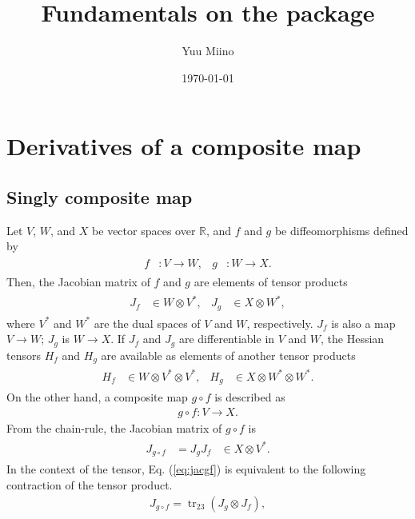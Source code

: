 \documentclass[a4paper]{article}
\title{Fundamentals on the package}
\author{Yuu Miino}
\date{\today}
\newcommand{\R}{\mathbb{R}}
\newcommand{\jac}{J}
\newcommand{\hes}{H}
\newcommand{\parens}[1]{\left(#1\right)}
\newcommand{\tr}{\mathop{\mathrm{tr}}\nolimits}
\begin{document}
\maketitle
\section{Derivatives of a composite map}
\subsection{Singly composite map}
Let $V$, $W$, and $X$ be vector spaces over $\R$,
and $f$ and $g$ be diffeomorphisms defined by
\begin{align}
    \begin{aligned}
        f&: V \to W, &
        g&: W \to X.
    \end{aligned}
\end{align}
Then, the Jacobian matrix of $f$ and $g$ are elements of tensor products
\begin{align}
    \begin{aligned}
        \jac_f &\in W \otimes V^*, &
        \jac_g &\in X \otimes W^*,
    \end{aligned}
\end{align}
where $V^*$ and $W^*$ are the dual spaces of $V$ and $W$, respectively.
$\jac_f$ is also a map $V \to W$; $\jac_g$ is $W \to X$.
If $\jac_f$ and $\jac_g$ are differentiable in $V$ and $W$,
the Hessian tensors $\hes_f$ and $\hes_g$ are available as elements of another tensor products
\begin{align}
    \begin{aligned}
        \hes_f &\in W \otimes V^* \otimes V^*, &
        \hes_g &\in X \otimes W^* \otimes W^*.
    \end{aligned}
\end{align}
On the other hand, a composite map $g\circ f$ is described as
\begin{align}
    g \circ f: V \to X.
\end{align}
From the chain-rule, the Jacobian matrix of $g\circ f$ is
\begin{align}
    \begin{aligned}
        \jac_{g\circ f} &= \jac_g \jac_f  &\in X \otimes V^*.
    \end{aligned}
    \label{eq:jacgf}
\end{align}
In the context of the tensor, Eq. (\ref{eq:jacgf}) is equivalent to
the following contraction of the tensor product.
\begin{align}
    \jac_{g\circ f} = \tr_{23} \parens{
        \jac_g \otimes \jac_f
    },
\end{align}
\end{document}

